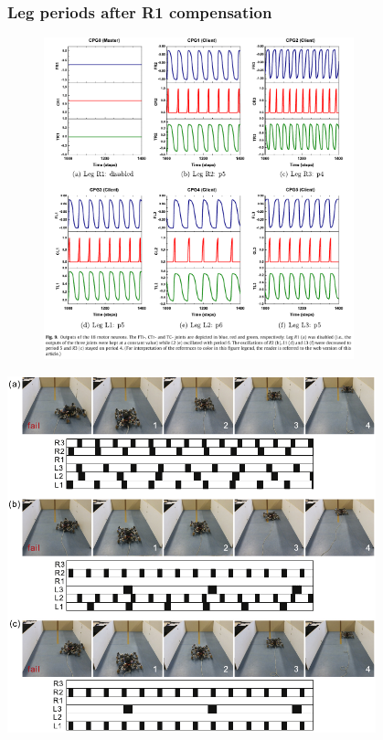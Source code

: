 \documentclass{beamer}
\begin{document}
\begin{frame}
\frametitle{Leg periods after R1 compensation}
\vspace*{-0.35cm}
\begin{figure}
\hspace*{-1.3cm}
\includegraphics[width=0.8\textwidth]{figs/periods-after-learning.pdf}
\end{figure}
\end{frame}

\begin{frame}
    \vspace*{1cm}
    \hspace*{1.1cm}
    \includegraphics[width=0.8\textwidth]{figs/real-experiments.pdf}
\end{frame}
\end{document}
